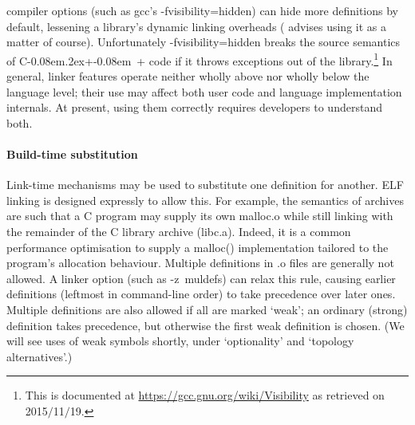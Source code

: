 \documentclass[preprint,10pt]{sigplanconf-pldi16}
\def\Cplusplus{C\kern-0.08em\raise.2ex\hbox{\footnotesize +\kern-0.08em +}}
\begin{document}
compiler options (such as \textsf{gcc}'s \textsf{-fvisibility=hidden})
can hide more definitions by default, lessening a library's dynamic linking overheads
(\citet{drepper_how_2011} advises using it as a matter of course).
Unfortunately \textsf{-fvisibility=hidden} breaks the source semantics of \Cplusplus{} code 
if it throws exceptions out of the library.\footnote{This is documented at \url{https://gcc.gnu.org/wiki/Visibility}
as retrieved on 2015$/$11$/$19.}
In general, linker features operate neither wholly above nor wholly below the language level; 
their use may affect both user code and language implementation internals.
At present, using them correctly requires developers to understand both.


\paragraph{Build-time substitution}\label{sec:substitution}
Link-time mechanisms may be used to substitute one definition for another.
ELF linking is designed expressly to allow this.
For example, the semantics of archives are such that a C program
may supply its own \textsf{malloc.o} while still linking with 
the remainder of the C library archive (\textsf{libc.a}).
Indeed, it is a common performance optimisation to supply a 
\textsf{malloc()} implementation tailored to the program's allocation behaviour.
Multiple definitions in \textsf{.o} files are generally not allowed.
A linker option (such as \textsf{-z~muldefs}) can relax this rule, causing earlier definitions (leftmost in command-line order) to take precedence over later ones.
Multiple definitions are also allowed if all are marked `weak';
an ordinary (strong) definition takes precedence, but otherwise the first weak definition is  chosen.
(We will see uses of weak symbols shortly, under
`optionality' and `topology alternatives'.)
\end{document}
